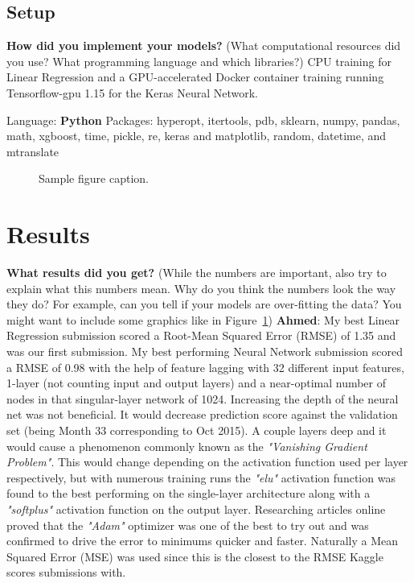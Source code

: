 \documentclass{article}
\begin{document}
\subsection{Setup}
\textbf{How did you implement your models?}
(What computational resources did you use? What programming language and which libraries?)\newline\newline
CPU training for Linear Regression and a GPU-accelerated Docker container training running Tensorflow-gpu 1.15 for the Keras Neural Network.\newline

Language: \textbf{Python}\newline
Packages:\newline
hyperopt, itertools, pdb, sklearn, numpy, pandas, math, xgboost, time, pickle, re, keras and matplotlib, random, datetime, and mtranslate\newline
\begin{figure}
  \centering
  \fbox{\rule[-.5cm]{0cm}{4cm} \rule[-.5cm]{4cm}{0cm}}
  \caption{Sample figure caption.}
  \label{fig:example}
\end{figure}


\section{Results}
\textbf{What results did you get?}
(While the numbers are important, also try to explain what this numbers mean. Why do you think the numbers look the way they do? For example, can you tell if your models are over-fitting the data? You might want to include some graphics like in Figure~\ref{fig:example})\newline\newline
\textbf{Ahmed}: \newline
My best Linear Regression submission scored a Root-Mean Squared Error (RMSE) of 1.35 and was our first submission. \newline\newline
My best performing Neural Network submission scored a RMSE of 0.98 with the help of feature lagging with 32 different input features, 1-layer (not counting input and output layers) and a near-optimal number of nodes in that singular-layer network of 1024. Increasing the depth of the neural net was not beneficial. It would decrease prediction score against the validation set (being Month 33 corresponding to Oct 2015). A couple layers deep and it would cause a phenomenon commonly known as the \textit{"Vanishing Gradient Problem"}. This would change depending on the activation function used per layer respectively, but with numerous training runs the \textit{"elu"} activation function was found to the best performing on the single-layer architecture along with a \textit{"softplus"} activation function on the output layer. Researching articles online proved that the \textit{"Adam"} optimizer was one of the best to try out and was confirmed to drive the error to minimums quicker and faster. Naturally a Mean Squared Error (MSE) was used since this is the closest to the RMSE Kaggle scores submissions with.
\end{document}
